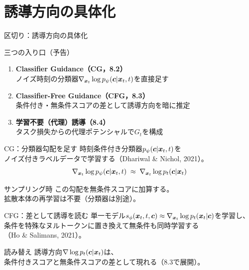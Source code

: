 \section{誘導方向の具体化}
\asmain
\begin{frame}{区切り：誘導方向の具体化}
    \tableofcontents[currentsection]
\end{frame}
\asmain
\begin{frame}{三つの入り口（予告）}
    \begin{enumerate}
        \item \textbf{Classifier Guidance（CG，8.2）}\\
        ノイズ時刻の分類器$\nabla_{\bm{x}_t}\log p_\psi(\bm{c}|\bm{x}_t,t)$を直接足す
        \item \textbf{Classifier-Free Guidance（CFG，8.3）}\\
        条件付き・無条件スコアの差として誘導方向を暗に推定
        \item \textbf{学習不要（代理）誘導（8.4）}\\
        タスク損失からの代理ポテンシャルで$G_t$を構成
    \end{enumerate}
\end{frame}
\asmain
\begin{frame}{CG：分類器勾配を足す}
    時刻条件付き分類器$p_\psi(\bm{c}|\bm{x}_t,t)$を\\
    ノイズ付きラベルデータで学習する（Dhariwal \& Nichol, 2021）。
    \[
        \nabla_{\bm{x}_t}\log p_\psi(\bm{c}|\bm{x}_t,t)
        \;\approx\;
        \nabla_{\bm{x}_t}\log p_t(\bm{c}|\bm{x}_t)
    \]
    \begin{block}{サンプリング時}
        この勾配を無条件スコアに加算する。\\
        拡散本体の再学習は不要（分類器は別途）。
    \end{block}
\end{frame}
\asmain
\begin{frame}{CFG：差として誘導を読む}
    単一モデル$s_\phi(\bm{x}_t,t,\bm{c})\approx\nabla_{\bm{x}_t}\log p_t(\bm{x}_t|\bm{c})$を学習し、\\
    条件を特殊なヌルトークンに置き換えて無条件も同時学習する\\
    （Ho \& Salimans, 2021）。
    \begin{exampleblock}{読み替え}
        誘導方向$\nabla\log p_t(\bm{c}|\bm{x}_t)$は、\\
        条件付きスコアと無条件スコアの差として現れる（8.3で展開）。
    \end{exampleblock}
\end{frame}
